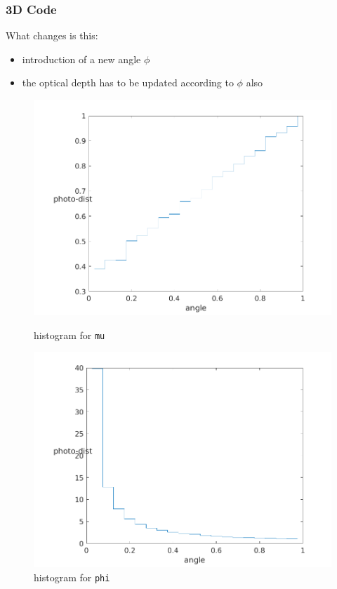 \documentclass[../main/main.tex]{subfiles}
\begin{document}
\newpage
\subsubsection{3D Code}
What changes is this: 
\begin{itemize}
\item introduction of a new angle $\phi$
\item the optical depth has to be updated according to $\phi$ also
\end{itemize}

\begin{figure}[!htp]
\centering
\begin{minipage}{.5\textwidth}
\includegraphics[width=\textwidth]{../../introductory_exercises/limb_darkening/number_channels20number_photons100000max_opt_depth10.png}
\caption{histogram for \texttt{mu}}
\label{3D_mu}
\end{minipage}%
\begin{minipage}{.5\textwidth}
\includegraphics[width=\textwidth]{../../introductory_exercises/limb_darkening/PHI_number_channels20number_photons100000max_opt_depth10.png}
\caption{histogram for \texttt{phi}}
\label{3D_phi}
\end{minipage}
\end{figure}
\end{document}
